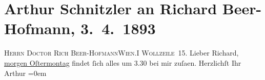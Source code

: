 

         
         \renewcommand{\erwaehntePersonen}{Personen: Richard Beer-Hofmann}
         \renewcommand{\erwaehnteOrte}{Orte: Wien, Wollzeile}
         \renewcommand{\erwaehnteWerke}{}
               \section[Arthur Schnitzler an Richard Beer-Hofmann, 3. 4. 1893]{ Arthur Schnitzler an Richard Beer-Hofmann, 3. 4. 1893}\nopagebreak{}\rehead{ }\begin{ledgroupsized}[t]{13cm}\normalsize\beginnumbering \toendnotes[C]{\smallbreak\pagebreak[2]} 
\pstart{}{\pb}\textsc{Herrn Doctor Rich Beer-Hofmann}\pend{}\pstart{}\textsc{Wien.}\pend{}\pstart{}\textsc{I Wollzeile 15}.\pend{}{\bigskip}\pstart
           \noindent{}{\pb}Lieber Richard, \uline{morgen Oſtermontag} findet ſich alles um
                  3.30 bei mir zuſa{\geminationm}en.\pend
           \pstart
           Herzlichſt Ihr{\\[\baselineskip]}\spacefill\mbox{Arthur}\pend
           \leftskip=0em{}
         
         \endnumbering{}\end{ledgroupsized}  \newcommand{\dateiname}{L00195}\newcommand{\titel}{Arthur Schnitzler an Richard Beer-Hofmann, 3. 4. 1893}\newcommand{\editorInnen}{Martin Anton Müller und Gerd-Hermann Susen}
      